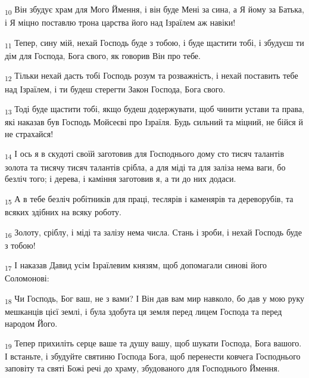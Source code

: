 \begin{tcolorbox}
\textsubscript{10} Він збудує храм для Мого Ймення, і він буде Мені за сина, а Я йому за Батька, і Я міцно поставлю трона царства його над Ізраїлем аж навіки!
\end{tcolorbox}
\begin{tcolorbox}
\textsubscript{11} Тепер, сину мій, нехай Господь буде з тобою, і буде щастити тобі, і збудуєш ти дім для Господа, Бога свого, як говорив Він про тебе.
\end{tcolorbox}
\begin{tcolorbox}
\textsubscript{12} Тільки нехай дасть тобі Господь розум та розважність, і нехай поставить тебе над Ізраїлем, і ти будеш стерегти Закон Господа, Бога свого.
\end{tcolorbox}
\begin{tcolorbox}
\textsubscript{13} Тоді буде щастити тобі, якщо будеш додержувати, щоб чинити устави та права, які наказав був Господь Мойсеєві про Ізраїля. Будь сильний та міцний, не бійся й не страхайся!
\end{tcolorbox}
\begin{tcolorbox}
\textsubscript{14} І ось я в скудоті своїй заготовив для Господнього дому сто тисяч талантів золота та тисячу тисяч талантів срібла, а для міді та для заліза нема ваги, бо безліч того; і дерева, і каміння заготовив я, а ти до них додаси.
\end{tcolorbox}
\begin{tcolorbox}
\textsubscript{15} А в тебе безліч робітників для праці, теслярів і каменярів та дереворубів, та всяких здібних на всяку роботу.
\end{tcolorbox}
\begin{tcolorbox}
\textsubscript{16} Золоту, сріблу, і міді та залізу нема числа. Стань і зроби, і нехай Господь буде з тобою!
\end{tcolorbox}
\begin{tcolorbox}
\textsubscript{17} І наказав Давид усім Ізраїлевим князям, щоб допомагали синові його Соломонові:
\end{tcolorbox}
\begin{tcolorbox}
\textsubscript{18} Чи Господь, Бог ваш, не з вами? І Він дав вам мир навколо, бо дав у мою руку мешканців цієї землі, і була здобута ця земля перед лицем Господа та перед народом Його.
\end{tcolorbox}
\begin{tcolorbox}
\textsubscript{19} Тепер прихиліть серце ваше та душу вашу, щоб шукати Господа, Бога вашого. І встаньте, і збудуйте святиню Господа Бога, щоб перенести ковчега Господнього заповіту та святі Божі речі до храму, збудованого для Господнього Ймення.
\end{tcolorbox}
